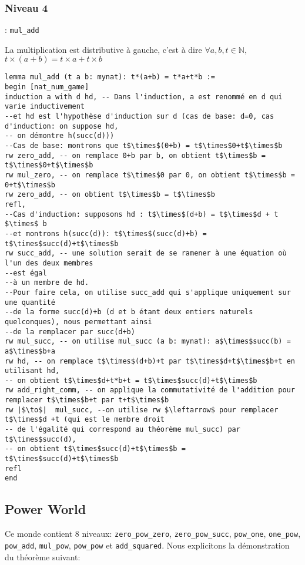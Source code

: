 \subsubsection{Niveau 4} :  \texttt{mul\_add}  \begin{center} La multiplication est distributive à gauche, c'est à dire  $\forall a, b, t \in \mathbb{N},$  $t\times(a+b)=t\times a+t\times b $ \end{center}
\begin{verbatim}
lemma mul_add (t a b: mynat): t*(a+b) = t*a+t*b :=
begin [nat_num_game]
induction a with d hd, -- Dans l'induction, a est renommé en d qui varie inductivement 
--et hd est l'hypothèse d'induction sur d (cas de base: d=0, cas d'induction: on suppose hd, 
-- on démontre h(succ(d)))   
--Cas de base: montrons que t$\times$(0+b) = t$\times$0+t$\times$b
rw zero_add, -- on remplace 0+b par b, on obtient t$\times$b = t$\times$0+t$\times$b 
rw mul_zero, -- on remplace t$\times$0 par 0, on obtient t$\times$b = 0+t$\times$b 
rw zero_add, -- on obtient t$\times$b = t$\times$b
refl,
--Cas d'induction: supposons hd : t$\times$(d+b) = t$\times$d + t $\times$ b
--et montrons h(succ(d)): t$\times$(succ(d)+b) = t$\times$succ(d)+t$\times$b 
rw succ_add, -- une solution serait de se ramener à une équation où l'un des deux membres 
--est égal 
--à un membre de hd. 
--Pour faire cela, on utilise succ_add qui s'applique uniquement sur une quantité 
--de la forme succ(d)+b (d et b étant deux entiers naturels quelconques), nous permettant ainsi 
--de la remplacer par succ(d+b)
rw mul_succ, -- on utilise mul_succ (a b: mynat): a$\times$succ(b) = a$\times$b+a
rw hd, -- on remplace t$\times$(d+b)+t par t$\times$d+t$\times$b+t en utilisant hd, 
-- on obtient t$\times$d+t*b+t = t$\times$succ(d)+t$\times$b
rw add_right_comm, -- on applique la commutativité de l'addition pour remplacer t$\times$b+t par t+t$\times$b
rw |$\to$|  mul_succ, --on utilise rw $\leftarrow$ pour remplacer t$\times$d +t (qui est le membre droit
-- de l'égalité qui correspond au théorème mul_succ) par t$\times$succ(d), 
-- on obtient t$\times$succ(d)+t$\times$b = t$\times$succ(d)+t$\times$b
refl
end
\end{verbatim}
\subsection{Power World}
Ce monde contient 8 niveaux: \texttt{zero\_pow\_zero}, \texttt{zero\_pow\_succ}, \texttt{pow\_one}, \texttt{one\_pow}, \texttt{pow\_add}, \texttt{mul\_pow}, \texttt{pow\_pow} et \texttt{add\_squared}.
Nous explicitons la démonstration du théorème suivant:\\
